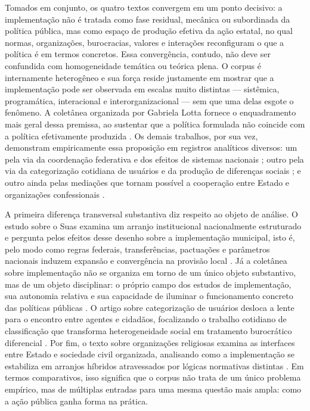 \documentclass[12pt,a4paper]{article}
\begin{document}
Tomados em conjunto, os quatro textos convergem em um ponto decisivo: a implementação não é tratada como fase residual, mecânica ou subordinada da política pública, mas como espaço de produção efetiva da ação estatal, no qual normas, organizações, burocracias, valores e interações reconfiguram o que a política é em termos concretos. Essa convergência, contudo, não deve ser confundida com homogeneidade temática ou teórica plena. O corpus é internamente heterogêneo e sua força reside justamente em mostrar que a implementação pode ser observada em escalas muito distintas — sistêmica, programática, interacional e interorganizacional — sem que uma delas esgote o fenômeno. A coletânea organizada por Gabriela Lotta fornece o enquadramento mais geral dessa premissa, ao sustentar que a política formulada não coincide com a política efetivamente produzida \parencite{lotta2019_teorias_analises}. Os demais trabalhos, por sua vez, demonstram empiricamente essa proposição em registros analíticos diversos: um pela via da coordenação federativa e dos efeitos de sistemas nacionais \parencite{bichir2020_sistemas_nacionais}; outro pela via da categorização cotidiana de usuários e da produção de diferenças sociais \parencite{lotta2020_categorizando_usuarios}; e outro ainda pelas mediações que tornam possível a cooperação entre Estado e organizações confessionais \parencite{lotta2023_jesus_speaks}.

A primeira diferença transversal substantiva diz respeito ao objeto de análise. O estudo sobre o Suas examina um arranjo institucional nacionalmente estruturado e pergunta pelos efeitos desse desenho sobre a implementação municipal, isto é, pelo modo como regras federais, transferências, pactuações e parâmetros nacionais induzem expansão e convergência na provisão local \parencite{bichir2020_sistemas_nacionais}. Já a coletânea sobre implementação não se organiza em torno de um único objeto substantivo, mas de um objeto disciplinar: o próprio campo dos estudos de implementação, sua autonomia relativa e sua capacidade de iluminar o funcionamento concreto das políticas públicas \parencite{lotta2019_teorias_analises}. O artigo sobre categorização de usuários desloca a lente para o encontro entre agentes e cidadãos, focalizando o trabalho cotidiano de classificação que transforma heterogeneidade social em tratamento burocrático diferencial \parencite{lotta2020_categorizando_usuarios}. Por fim, o texto sobre organizações religiosas examina as interfaces entre Estado e sociedade civil organizada, analisando como a implementação se estabiliza em arranjos híbridos atravessados por lógicas normativas distintas \parencite{lotta2023_jesus_speaks}. Em termos comparativos, isso significa que o corpus não trata de um único problema empírico, mas de múltiplas entradas para uma mesma questão mais ampla: como a ação pública ganha forma na prática.
\end{document}
